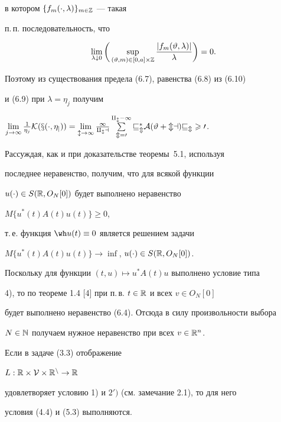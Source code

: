 в котором $\{f_m(\cdot,\lambda)\}_{m\in{\Bbb Z}}$ --- такая

п.\,п. последовательность, что

\begin{equation}

\lim_{\lambda\downarrow0}

\bigg(\sup_{(\vartheta,m)\in[0,a]\times{\Bbb Z}}

\frac{|f_m(\vartheta,\lambda)|}{\lambda}\bigg)=0.

\end{equation}



Поэтому из существования предела (6.7), равенства (6.8) из (6.10)

и (6.9) при $\lambda=\eta_j$ получим 

$\lim\limits_{j\to\infty}\frac{1}{\eta_j}\cal K(x(\cdot,\eta_j))

=\lim\limits_{l\to\infty}\frac{1}{q_la}\sum\limits_{m=0}^{q_l-1}

v_m^{*}A(\vartheta+ma)v_m\geqslant 0$.

Рассуждая, как и при доказательстве теоремы~5.1, используя

последнее неравенство, получим, что для всякой функции

$u(\cdot)\in S(\Bbb R,O_N[0])$ будет выполнено неравенство

$M\{u^*(t)A(t)u(t)\}\geqslant 0$,

т.\,е. функция $\wh u(t)\equiv 0$ является решением задачи

$M\{u^*(t)A(t)u(t)\}\to\inf$, $u(\cdot)\in S(\Bbb R,O_N[0])$.



Поскольку для функции $(t,u)\mapsto u^*A(t)u$ выполнено условие типа

4), то по теореме 1.4 [4] при п.\,в. $t\in\Bbb R$ и всех $v\in O_N[0]$

будет выполнено неравенство (6.4). Отсюда в силу произвольности выбора

$N\in\Bbb N$ получаем нужное неравенство при всех $v\in\Bbb R^n$.



\begin{notes}

Если в задаче (3.3) отображение

$L:\Bbb R\times\cal V\times\Bbb R^n\to\Bbb R$

удовлетворяет условию 1) и $2')$ (см. замечание 2.1), то для него

условия (4.4) и (5.3) выполняются.

\end{notes}



